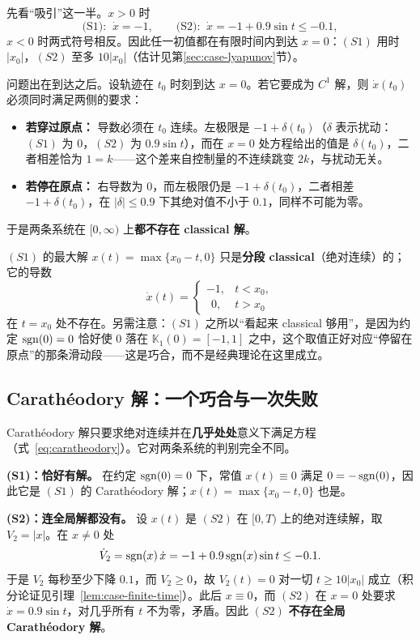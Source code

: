 先看“吸引”这一半。$x>0$ 时
\[
\text{(S1): }\ \dot x=-1,
\qquad
\text{(S2): }\ \dot x=-1+0.9\sin t\le-0.1,
\]
$x<0$ 时两式符号相反。因此任一初值都在有限时间内到达 $x=0$：$(S1)$ 用时 $|x_0|$，$(S2)$ 至多 $10|x_0|$（估计见第\ref{sec:case-lyapunov}节）。

问题出在到达之后。设轨迹在 $t_0$ 时刻到达 $x=0$。若它要成为 $C^1$ 解，则 $\dot x(t_0)$ 必须同时满足两侧的要求：

\begin{itemize}
  \item \textbf{若穿过原点：} 导数必须在 $t_0$ 连续。左极限是 $-1+\delta(t_0)$（$\delta$ 表示扰动：$(S1)$ 为 $0$，$(S2)$ 为 $0.9\sin t$），而在 $x=0$ 处方程给出的值是 $\delta(t_0)$，二者相差恰为 $1=k$——这个差来自控制量的不连续跳变 $2k$，与扰动无关。
  \item \textbf{若停在原点：} 右导数为 $0$，而左极限仍是 $-1+\delta(t_0)$，二者相差 $-1+\delta(t_0)$，在 $|\delta|\le0.9$ 下其绝对值不小于 $0.1$，同样不可能为零。
\end{itemize}

于是两条系统在 $[0,\infty)$ 上\textbf{都不存在 classical 解}。

$(S1)$ 的最大解 $x(t)=\max\{x_0-t,0\}$ 只是\textbf{分段 classical}（绝对连续）的；它的导数
\[
\dot x(t)=\begin{cases}
  -1,& t<x_0,\\
  \ \ 0,& t>x_0
\end{cases}
\]
在 $t=x_0$ 处不存在。另需注意：$(S1)$ 之所以“看起来 classical 够用”，是因为约定 $\operatorname{sgn}(0)=0$ 恰好使 $0$ 落在 $\mathbb{K}_1(0)=[-1,1]$ 之中，这个取值正好对应“停留在原点”的那条滑动段——这是巧合，而不是经典理论在这里成立。

\subsection{Carathéodory 解：一个巧合与一次失败}

Carathéodory 解只要求绝对连续并在\textbf{几乎处处}意义下满足方程（式~\eqref{eq:caratheodory}）。它对两条系统的判别完全不同。

\textbf{(S1)：恰好有解。} 在约定 $\operatorname{sgn}(0)=0$ 下，常值 $x(t)\equiv0$ 满足 $0=-\operatorname{sgn}(0)$，因此它是 $(S1)$ 的 Carathéodory 解；$x(t)=\max\{x_0-t,0\}$ 也是。

\textbf{(S2)：连全局解都没有。} 设 $x(t)$ 是 $(S2)$ 在 $[0,T)$ 上的绝对连续解，取 $V_2=|x|$。在 $x\neq0$ 处
\[
\dot V_2=\operatorname{sgn}(x)\,\dot x=-1+0.9\operatorname{sgn}(x)\sin t\le-0.1 .
\]
于是 $V_2$ 每秒至少下降 $0.1$，而 $V_2\ge0$，故 $V_2(t)=0$ 对一切 $t\ge10|x_0|$ 成立（积分论证见引理~\ref{lem:case-finite-time}）。此后 $x\equiv0$，而 $(S2)$ 在 $x=0$ 处要求 $\dot x=0.9\sin t$，对几乎所有 $t$ 不为零，矛盾。因此 $(S2)$ \textbf{不存在全局 Carathéodory 解}。

